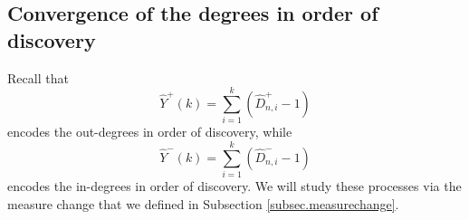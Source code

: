 

\subsection{Convergence of the degrees in order of discovery}
Recall that
$$ \hat{Y}^+(k)=\sum\limits_{i=1}^k (\hat{D}^+_{n,i}-1)$$
encodes the out-degrees in order of discovery, while 
$$ \hat{Y}^-(k)=\sum\limits_{i=1}^k (\hat{D}^-_{n,i}-1)$$
encodes the in-degrees in order of discovery.
 We will study these processes via the measure change that we defined in Subsection \ref{subsec.measurechange}. 
 

